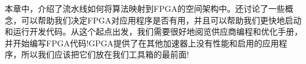 
本章中，介绍了流水线如何将算法映射到FPGA的空间架构中。还讨论了一些概念，可以帮助我们决定FPGA对应用程序是否有用，并且可以帮助我们更快地启动和运行开发代码。从这个起点出发，我们需要很好地阅览供应商编程和优化手册，并开始编写FPGA代码!GPGA提供了在其他加速器上没有性能和启用的应用程序，所以我们应该把它们放在我们工具箱的最前面!\par


\newpage
